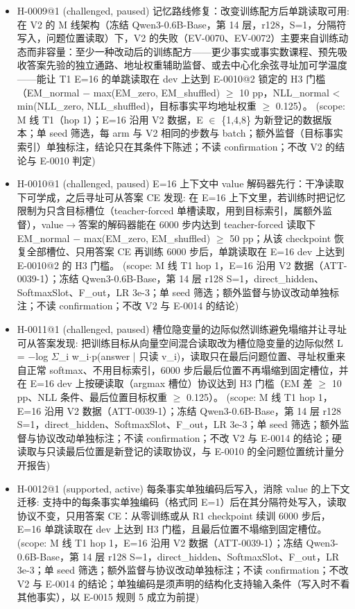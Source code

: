 \documentclass[11pt]{article}
\begin{document}
\begin{itemize}
\item H-0009@1 (challenged, paused) 记忆路线修复：改变训练配方后单跳读取可用: 在 V2 的 M 线架构（冻结 Qwen3-0.6B-Base，第 14 层，r128，S=1，分隔符写入，问题位置读取）下，V2 的失败（EV-0070、EV-0072）主要来自训练动态而非容量：至少一种改动后的训练配方------更少事实或事实数课程、预先吸收答案先验的独立通路、地址权重辅助监督、或去中心化余弦寻址加可学温度------能让 T1 E=16 的单跳读取在 dev 上达到 E-0010@2 锁定的 H3 门槛（EM\_normal \ensuremath{-} max(EM\_zero, EM\_shuffled) \ensuremath{\geq} 10 pp，NLL\_normal \textless{} min(NLL\_zero, NLL\_shuffled)，目标事实平均地址权重 \ensuremath{\geq} 0.125）。 (scope: M 线 T1（hop 1）；E=16 沿用 V2 数据，E \ensuremath{\in} \{1,4,8\} 为新登记的数据版本；单 seed 筛选，每 arm 与 V2 相同的步数与 batch；额外监督（目标事实索引）单独标注，结论只在其条件下陈述；不读 confirmation；不改 V2 的结论与 E-0010 判定)
\item H-0010@1 (challenged, paused) E=16 上下文中 value 解码器先行：干净读取下可学成，之后寻址可从答案 CE 发现: 在 E=16 上下文里，若训练时把记忆限制为只含目标槽位（teacher-forced 单槽读取，用到目标索引，属额外监督），value\ensuremath{\rightarrow}答案的解码器能在 6000 步内达到 teacher-forced 读取下 EM\_normal \ensuremath{-} max(EM\_zero, EM\_shuffled) \ensuremath{\geq} 50 pp；从该 checkpoint 恢复全部槽位、只用答案 CE 再训练 6000 步后，单跳读取在 E=16 dev 上达到 E-0010@2 的 H3 门槛。 (scope: M 线 T1 hop 1，E=16 沿用 V2 数据（ATT-0039-1）；冻结 Qwen3-0.6B-Base，第 14 层 r128 S=1，direct\_hidden、SoftmaxSlot、F\_out，LR 3e-3；单 seed 筛选；额外监督与协议改动单独标注；不读 confirmation；不改 V2 与 E-0014 的结论)
\item H-0011@1 (challenged, paused) 槽位隐变量的边际似然训练避免塌缩并让寻址可从答案发现: 把训练目标从向量空间混合读取改为槽位隐变量的边际似然 L = \ensuremath{-}log \ensuremath{\Sigma}\_i w\_i\ensuremath{\cdot}p(answer | 只读 v\_i)，读取只在最后问题位置、寻址权重来自正常 softmax、不用目标索引，6000 步后最后位置不再塌缩到固定槽位，并在 E=16 dev 上按硬读取（argmax 槽位）协议达到 H3 门槛（EM 差 \ensuremath{\geq} 10 pp、NLL 条件、最后位置目标权重 \ensuremath{\geq} 0.125）。 (scope: M 线 T1 hop 1，E=16 沿用 V2 数据（ATT-0039-1）；冻结 Qwen3-0.6B-Base，第 14 层 r128 S=1，direct\_hidden、SoftmaxSlot、F\_out，LR 3e-3；单 seed 筛选；额外监督与协议改动单独标注；不读 confirmation；不改 V2 与 E-0014 的结论；硬读取与只读最后位置是新登记的读取协议，与 E-0010 的全问题位置统计量分开报告)
\item H-0012@1 (supported, active) 每条事实单独编码后写入，消除 value 的上下文迁移: 支持中的每条事实单独编码（格式同 E=1）后在其分隔符处写入，读取协议不变，只用答案 CE：从零训练或从 R1 checkpoint 续训 6000 步后，E=16 单跳读取在 dev 上达到 H3 门槛，且最后位置不塌缩到固定槽位。 (scope: M 线 T1 hop 1，E=16 沿用 V2 数据（ATT-0039-1）；冻结 Qwen3-0.6B-Base，第 14 层 r128 S=1，direct\_hidden、SoftmaxSlot、F\_out，LR 3e-3；单 seed 筛选；额外监督与协议改动单独标注；不读 confirmation；不改 V2 与 E-0014 的结论；单独编码是须声明的结构化支持输入条件（写入时不看其他事实），以 E-0015 规则 5 成立为前提)

\end{itemize}
\end{document}
